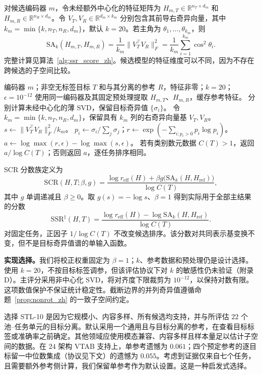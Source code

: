 \documentclass{article}
\newcommand{\reff}{\ensuremath{r_{\mathrm{eff}}}\xspace}
\newcommand{\SAk}{\ensuremath{\mathrm{SA}_k}\xspace}
\newcommand{\SSRdag}{\ensuremath{\mathrm{SSR}^{\ddagger}}\xspace}
\begin{document}
对候选编码器 $m$，令未经额外中心化的特征矩阵为 $H_{m,T}\in\mathbb R^{n_T\times d_m}$ 和 $H_{m,R}\in\mathbb R^{n_R\times d_m}$。令 $V_T,V_R\in\mathbb R^{d_m\times k_m}$ 分别包含其前导右奇异向量，其中 $k_m=\min\{k,n_T,n_R,d_m\}$，默认 $k=20$。若主角为 $\theta_1,\ldots,\theta_{k_m}$，则
\[
\SAk(H_{m,T},H_{m,R})=\frac{1}{k_m}\lVert V_T^\top V_R\rVert_F^2
=\frac{1}{k_m}\sum_{i=1}^{k_m}\cos^2\theta_i.
\]
完整计算见算法~\ref{alg:ssr_score_zh}。候选模型的特征维度可以不同，因为不存在跨候选的子空间比较。

\begin{algorithm}[t]
\caption{单个候选的零标签 \SSRdag 评分}
\label{alg:ssr_score_zh}
\begin{algorithmic}[1]
\Require 编码器 $m$；非空无标签目标 $T$ 和与其分离的参考 $R$，特征非零；$k=20$；$\epsilon=10^{-12}$
\State 使用同一编码器及其固定预处理提取 $H_{m,T}$、$H_{m,R}$，缓存参考特征。
\State 分别计算未经中心化的薄 SVD，保留目标奇异值 $\{\sigma_i\}$。
\State 令 $k_m=\min\{k,n_T,n_R,d_m\}$，保留具有 $k_m$ 列的右奇异向量基 $V_T,V_R$。
\State $s\gets \lVert V_T^\top V_R\rVert_F^2/k_m$。
\State $p_i\gets\sigma_i/\sum_j\sigma_j$；$r\gets\exp(-\sum_{i:p_i>0}p_i\log p_i)$。
\State $a\gets\log\max(r,\epsilon)-\log\max(s,\epsilon)$。
\State \Return 若有类别数元数据 $C(T)>1$，返回 $a/\log C(T)$；否则返回 $a$，逐任务排序相同。
\end{algorithmic}
\end{algorithm}

SCR 分数族定义为
\[
\mathrm{SCR}(H,T;\beta,g)=
\frac{\log\reff(H)+\beta g\bigl(\SAk(H,H_{\mathrm{ref}})\bigr)}{\log C(T)},
\]
其中 $g$ 单调递减且 $\beta\geq0$。取 $g(s)=-\log s$、$\beta=1$ 得到实际用于全部主结果的分数
\[
\boxed{\SSRdag(H,T)=\frac{\log\reff(H)-\log\SAk(H,H_{\mathrm{ref}})}{\log C(T)}}.
\]
对固定任务，正因子 $1/\log C(T)$ 不改变候选排序。该分数对共同表示基变换不变，但不是目标奇异值谱的单输入函数。

\textbf{实现选择。}我们将校正权重固定为 $\beta=1$；$k$、参考数据和预处理仍是设计选择。使用 $k=20$，不按目标标签调参，但该评估协议下对 $k$ 的敏感性仍未验证（附录 D）。主评分采用非中心化 SVD，将对齐度下限裁剪为 $10^{-12}$，以保持对数有限。这项数值保护不保证统计稳定性。截断边界的并列奇异值遵循命题~\ref{prop:nonrot_zh} 的一致子空间约定。

选择 STL-10 是因为它规模小、内容多样、所有候选均支持，并与所评估 $22$ 个池--任务单元的目标分离。默认采用一个通用且与目标分离的参考，在查看目标标签或准确率之前确定。其他领域应使用模态兼容、内容多样且样本量足以估计子空间的数据。在 $24$ 架构 VTAB 支持上，单参考遗憾为 $0.061$；四个预定参考的逐目标留一中位数集成（协议见下文）的遗憾为 $0.055$。考虑到证据仅来自七个任务，且需要额外参考侧计算，我们保留单参考作为默认设置。这是一种启发式选择。
\end{document}
